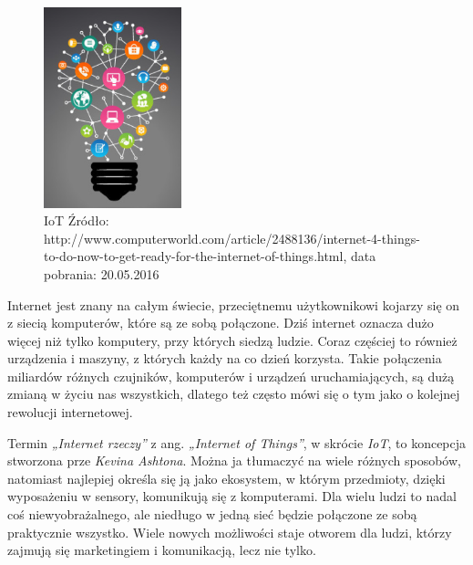 \documentclass[brudnopis]{xmgr}
\begin{document}
\maketitle
\introduction

 
\begin{figure}[h]
\centering
\includegraphics[width=4cm]{i}
\caption{IoT Źródło: http://www.computerworld.com/article/2488136/internet-4-things-to-do-now-to-get-ready-for-the-internet-of-things.html, data pobrania: 20.05.2016}
\end{figure}
Internet jest znany na całym świecie, przeciętnemu użytkownikowi
kojarzy się on z siecią komputerów, które są ze sobą połączone. Dziś internet oznacza dużo więcej niż tylko komputery, przy których siedzą ludzie. Coraz częściej to również urządzenia i maszyny, z których każdy na co dzień korzysta. Takie połączenia miliardów różnych czujników, komputerów i urządzeń uruchamiających, są dużą zmianą w życiu nas wszystkich, dlatego też często mówi się o tym jako o kolejnej rewolucji internetowej.

Termin \emph{„Internet rzeczy”} z ang. \emph{„Internet of Things”}, w skrócie \emph{IoT}, to koncepcja stworzona prze \emph{Kevina Ashtona}. Można ja tłumaczyć na wiele różnych sposobów, natomiast najlepiej określa się ją jako ekosystem, w którym przedmioty, dzięki wyposażeniu w sensory, komunikują się z komputerami. Dla wielu ludzi to nadal coś niewyobrażalnego, ale niedługo w jedną sieć będzie połączone ze sobą praktycznie wszystko. Wiele nowych możliwości staje otworem dla ludzi, którzy zajmują się marketingiem i komunikacją, lecz nie tylko. 
\end{document}

